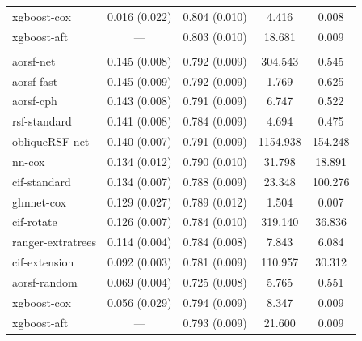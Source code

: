\documentclass[twoside,11pt]{article}\usepackage[]{graphicx}\usepackage[]{xcolor}
\newenvironment{knitrout}{}{} %
\begin{document}
\begin{knitrout}
\begin{longtable}[t]{lcccc}
\hspace{1em}xgboost-cox & 0.016 (0.022) & 0.804 (0.010) & 4.416 & 0.008\\
\hspace{1em}xgboost-aft & --- & 0.803 (0.010) & 18.681 & 0.009\\
\addlinespace[0.3em]
\multicolumn{5}{l}{\textit{\textbf{MESA; death, n = 6793, p = 48}}}\\
\hline
\hspace{1em}aorsf-net & 0.145 (0.008) & 0.792 (0.009) & 304.543 & 0.545\\
\hspace{1em}aorsf-fast & 0.145 (0.009) & 0.792 (0.009) & 1.769 & 0.625\\
\hspace{1em}aorsf-cph & 0.143 (0.008) & 0.791 (0.009) & 6.747 & 0.522\\
\hspace{1em}rsf-standard & 0.141 (0.008) & 0.784 (0.009) & 4.694 & 0.475\\
\hspace{1em}obliqueRSF-net & 0.140 (0.007) & 0.791 (0.009) & 1154.938 & 154.248\\
\hspace{1em}nn-cox & 0.134 (0.012) & 0.790 (0.010) & 31.798 & 18.891\\
\hspace{1em}cif-standard & 0.134 (0.007) & 0.788 (0.009) & 23.348 & 100.276\\
\hspace{1em}glmnet-cox & 0.129 (0.027) & 0.789 (0.012) & 1.504 & 0.007\\
\hspace{1em}cif-rotate & 0.126 (0.007) & 0.784 (0.010) & 319.140 & 36.836\\
\hspace{1em}ranger-extratrees & 0.114 (0.004) & 0.784 (0.008) & 7.843 & 6.084\\
\hspace{1em}cif-extension & 0.092 (0.003) & 0.781 (0.009) & 110.957 & 30.312\\
\hspace{1em}aorsf-random & 0.069 (0.004) & 0.725 (0.008) & 5.765 & 0.551\\
\hspace{1em}xgboost-cox & 0.056 (0.029) & 0.794 (0.009) & 8.347 & 0.009\\
\hspace{1em}xgboost-aft & --- & 0.793 (0.009) & 21.600 & 0.009\\

\end{longtable}
\end{knitrout}
\end{document}

